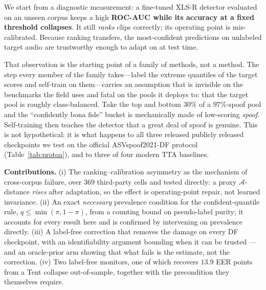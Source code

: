 \documentclass[conference]{IEEEtran}
\begin{document}
We start from a diagnostic measurement: a fine-tuned XLS-R detector evaluated on
an unseen corpus keeps a high \textbf{ROC-AUC while its accuracy at a fixed
threshold collapses}. It still \emph{ranks} clips correctly; its operating point
is mis-calibrated. Because ranking transfers, the most-confident predictions on
unlabeled target audio are trustworthy enough to adapt on at test time.

That observation is the starting point of a family of methods, not a method.
The step every member of the family takes---label the extreme quantiles of the
target scores and self-train on them---carries an assumption that is invisible
on the benchmarks the field uses and fatal on the pools it deploys to: that the
target pool is roughly class-balanced. Take the top and bottom $30\%$ of a
$97\%$-spoof pool and the ``confidently bona fide'' bucket is mechanically made
of low-scoring \emph{spoof}. Self-training then teaches the detector that a
great deal of spoof is genuine. This is not hypothetical: it is what happens to all three released
publicly released checkpoints we test on the official ASVspoof2021-DF protocol
(Table~\ref{tab:protoa}), and to three of four modern TTA baselines.

\textbf{Contributions.} (i) The ranking--calibration asymmetry as the mechanism
of cross-corpus failure, over $369$ third-party cells and tested directly: a
proxy $\mathcal{A}$-distance \emph{rises} after adaptation, so the effect is
operating-point repair, not learned invariance. (ii) An exact \emph{necessary}
prevalence condition for the confident-quantile rule, $q\le\min(\pi,1{-}\pi)$,
from a counting bound on pseudo-label purity; it accounts for every result here
and is confirmed by intervening on prevalence directly. (iii) A label-free
correction that removes the damage on every DF checkpoint, with an
identifiability argument bounding when it can be trusted --- and an oracle-prior
arm showing that what fails is the estimate, not the correction. (iv) Two
label-free monitors, one of which recovers $13.9$ EER points from a Tent
collapse out-of-sample, together with the precondition they themselves require.
\end{document}
